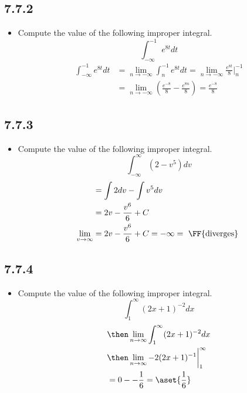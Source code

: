 \begin{itemize}
  \subsection{7.7.2}
  \begin{itemize}
    \item Compute the value of the following improper integral.
      \[%
      \int_{-\infty}^{-1} e^{8t}dt
      \]%
      \begin{align*}
        \int_{-\infty}^{-1} e^{8t}dt &= \lim_{n \to -\infty} \int_{n}^{-1} e^{8t}dt
        = \lim_{n \to -\infty} \frac{e^{8t}}{8}\bigg|_n^{-1} \\
        &=\lim_{n \to -\infty} \left( \frac{e^{-8}}{8} - \frac{e^{8n}}{8} \right)
        = \frac{e^{-8}}{8}
      \end{align*}
  \end{itemize}

  \subsection{7.7.3}
  \begin{itemize}
    \item Compute the value of the following improper integral.
      \[%
        \int_{-\infty}^{\infty} (2-v^5)dv
      \]%
    \begin{align*}
      &= \int 2dv - \int v^5 dv \\
      &= 2v - \frac{v^6}{6} + C \\
      \lim_{v \to \infty} &= 2v - \frac{v^6}{6} + C  = -\infty = ~\text{\FF{diverges}}~\\
    \end{align*}
  \end{itemize}

  \subsection{7.7.4}
  \begin{itemize}
    \item Compute the value of the following improper integral.
      \[%
        \int_{1}^{\infty} (2x+1)^{-2}dx
      \]%
      \begin{align*}
        &\then \lim_{n \to \infty} \int_{1}^{\infty}  (2x+1)^{-2}dx \\
        &\then \lim_{n \to \infty}  -2(2x+1)^{-1} \bigg|_{1}^{\infty} \\
        &= 0 - -\frac{1}{6}  = \aset{\frac{1}{6}}
      \end{align*}
  \end{itemize}

\end{itemize}
